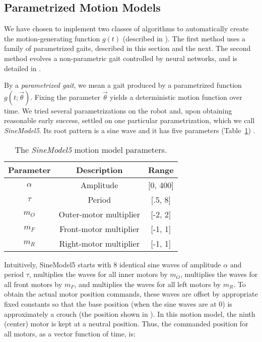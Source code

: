 \subsection{Parametrized Motion Models}

We have chosen to implement two classes of algorithms to automatically create the motion-generating function $g(t)$ (described in
).  The first method uses a family of
parametrized gaits, described in this section and the next. The
second method evolves a non-parametric gait controlled by neural networks, and is detailed in
.

By a \emph{parametrized gait}, we mean a gait produced by a
parametrized function $g(t; \vec{\theta})$. Fixing the parameter
$\vec{\theta}$ yields a deterministic motion function over time.  We
tried several parametrizations on the robot and, upon obtaining
reasonable early success, settled on one particular parametrization, which we call  \emph{SineModel5}. Its root pattern is a sine wave and it has five parameters (Table~\ref{tab:params}) .

\newcommand{\amp}{\ensuremath{\alpha}}

\begin{table}[h!]
\begin{center}
\begin{tabular}{|c|c|c|}
\hline
Parameter    & Description               & Range \\
\hline
\hline
\amp         & Amplitude                 & [0, 400] \\
\hline
$\tau$       & Period                    & [.5, 8] \\
\hline
$m_O$        & Outer-motor multiplier    & [-2, 2] \\
\hline
$m_F$        & Front-motor multiplier    & [-1, 1] \\
\hline
$m_R$        & Right-motor multiplier    & [-1, 1] \\
\hline
\end{tabular}
\caption{The \emph{SineModel5} motion model parameters.}
\label{tab:params}
\end{center}
\end{table}


Intuitively, SineModel5 starts with 8 identical sine waves of
amplitude $\amp$ and period $\tau$, multiplies the waves for all inner
motors by $m_O$, multiplies the waves for all front motors by $m_F$,
and multiplies the waves for all left motors by $m_R$.  To obtain the
actual motor position commands, these waves are offset by
appropriate fixed constants so that the base position (when the sine
waves are at 0) is approximately a crouch (the position shown in
).  In this motion model, the ninth
(center) motor is kept at a neutral position.  Thus, the commanded
position for all motors, as a vector function of time, is:

